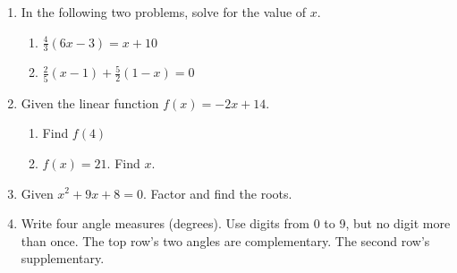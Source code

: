\documentclass[12pt, twoside]{article}
\begin{document}
\begin{enumerate}
\newpage
\item In the following two problems, solve for the value of $x$.
  \begin{multicols}{2}
    \begin{enumerate}
      \item   $\frac{4}{3}(6x-3)=x + 10$
      \item   $\frac{2}{5}(x-1)+\frac{5}{2}(1-x)=0$
    \end{enumerate}
  \end{multicols}
  \vspace{6cm}

\item Given the linear function $f(x)=-2x+14$.
\begin{multicols}{2}
  \begin{enumerate}
    \item Find $f(4)$
    \item   $f(x)=21$. Find $x$.
  \end{enumerate}
\end{multicols} \vspace{4cm}

\item Given $x^2+9x+8=0$. Factor and find the roots. \vspace{3cm} 

\item Write four angle measures (degrees). Use digits from 0 to 9, but no digit more than once.
The top row's two angles are complementary. The second row's supplementary.
\begin{center}
\end{center}

\end{enumerate}
\end{document}
